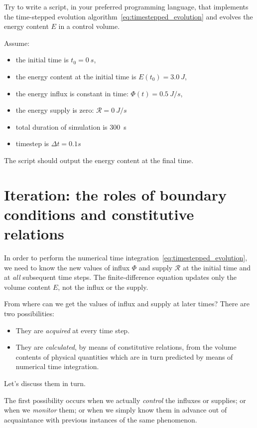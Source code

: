 \documentclass[a4paper,12pt,%
onecolumn,oneside,%
british%
]{memoir}
\newcommand*{\incr}{\Delta}%
\renewcommand*{\|}[1][]{\nonscript\:#1\vert\nonscript\:\mathopen{}}
\newcommand*{\yti}{t_{0}}
\newcommand*{\Dt}{\incr t}
\newcommand*{\yE}{E}
\newcommand*{\yH}{\varPhi}%
\newcommand*{\yR}{\mathcal{R}}%
\begin{document}
\begin{exercise}[label={ex:script1}]
  Try to write a script, in your preferred programming language, that implements the time-stepped evolution algorithm~\eqref{eq:timestepped_evolution} and evolves the energy content $\yE$ in a control volume.

  \smallskip
  
  Assume:
    \begin{itemize}[nosep]
    \item the initial time is $\yti = \qty{0}{s}$,
    \item the energy content at the initial time is $\yE(\yti) = \qty{3.0}{J}$,
    \item the energy influx is constant in time: $\yH(t) = \qty{0.5}{J/s}$,
    \item the energy supply is zero: $\yR = \qty{0}{J/s}$
    \item total duration of simulation is \qty{300}{s}
    \item timestep is $\Dt={0.1}{s}$
    \end{itemize}
    The script should output the energy content at the final time.
\end{exercise}

\section{Iteration: the roles of boundary conditions and constitutive relations}
\label{sec:boundary_conds}

In order to perform the numerical time integration~\eqref{eq:timestepped_evolution}, we need to know the new values of influx $\yH$ and supply $\yR$ at the initial time and at \emph{all} subsequent time steps. The finite-difference equation updates only the volume content $\yE$, not the influx or the supply.

From where can we get the values of influx and supply at later times? There are two possibilities:
\begin{itemize}
\item They are \emph{acquired} at every time step.
\item They are \emph{calculated}, by means of constitutive relations, from the volume contents of physical quantities which are in turn predicted by means of numerical time integration.
\end{itemize}
Let's discuss them in turn.

\medskip

The first possibility occurs when we actually \emph{control} the influxes or supplies; or when we \emph{monitor} them; or when we simply know them in advance out of acquaintance with previous instances of the same phenomenon.
\end{document}
